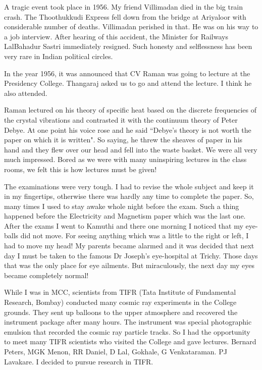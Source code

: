 A tragic event took place in 1956. My friend Villimadan died in the big 
train crash. The Thoothukkudi Express fell down from the bridge at 
Ariyaloor with considerable number of deaths. Villi\-madan perished in 
that. He was on his way to a job interview. After hearing of this 
accident, the Minister for Railways Lal\break Bahadur Sastri immediately 
resigned. Such honesty and selflessness has been very rare in Indian 
political circles.
\smallskip

In the year 1956, it was announced that CV Raman was going to lecture at 
the Presidency College. Thangaraj asked us to go and attend the lecture. 
I think he also attended.
\smallskip

Raman lectured on his theory of specific heat based on the discrete 
frequencies of the crystal vibrations and contrasted it with the 
continuum theory of Peter Debye. At one point his voice rose and he said 
``Debye's theory is not worth the paper on which it is written". So 
saying, he threw the sheaves of paper in his hand and they flew over our 
head and fell into the waste basket. We were all very much impressed. 
Bored as we were with many uninspiring lectures in the class rooms, we 
felt this is how lectures must be given!
\smallskip

The examinations were very tough. I had to revise the whole subject and 
keep it in my fingertips, otherwise there was hardly any time to 
complete the paper. So, many times I used to stay awake whole night 
before the exam. Such a thing happened before the Electricity and 
Magnetism paper which was the last one. After the exams I went to 
Kamuthi and there one morning I noticed that my eye-balls did not move. 
For seeing anything which was a little to the right or left, I had to 
move my head! My parents became alarmed and it was decided that next day 
I must be taken to the famous Dr Joseph's eye-hospital at Trichy. Those 
days that was the only place for eye ailments. But miraculously, the 
next day my eyes became completely normal!

While I was in MCC, scientists from TIFR (Tata Institute of Fundamental 
Research, Bombay) conducted many cosmic ray experiments in the College 
grounds. They sent up balloons to the upper atmosphere and recovered the 
instrument package after many hours. The instrument was special 
photographic emulsion that recorded the cosmic ray particle tracks. So I 
had the opportu\-nity to meet many TIFR scientists who visited the College 
and gave lectures. Bernard Peters, MGK Menon, RR Daniel, D Lal, Gokhale, 
G Venkataraman. PJ Lavakare. I decided to pursue research in TIFR.

